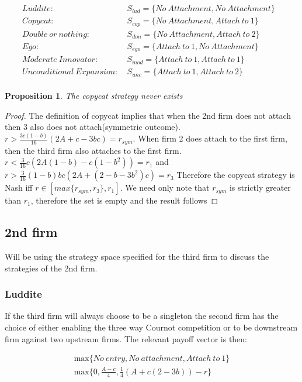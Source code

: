 \documentclass{article}
\newtheorem{proposition}{Proposition}
\begin{document}
\begin{align*}
Luddite: ~&S_{lud} =  
\{ No~ Attachment, 
No~ Attachment
\}& \\
 Copycat:~& S_{cop} =  
\{ No~ Attachment, 
Attach~to~1
\}& \\
Double~or~nothing:~ & S_{don} = 
\{ No~ Attachment, 
Attach~to~2
\}& \\ 
Ego:~& S_{ego} =  
\{ Attach~to~1, 
No~ Attachment
\}& \\
 Moderate~Innovator:~ & S_{mod} =  
\{  Attach~to~1, 
Attach~to~1
\}& \\
 Unconditional~Expansion:~ & S_{unc} = 
\{  Attach~to~1, 
Attach~to~2
\}& \\ 
\end{align*}

\begin{proposition}
The copycat strategy never exists
\end{proposition}

\begin{proof}
The definition of copycat implies that when the 2nd firm does not attach then 3 also does not attach(symmetric outcome). $r > \frac{3 c(1-b)}{16}(2A+c-3bc)=r_{sym}$. When firm 2 does attach to the first firm, then the third firm also attaches to the first firm. $r< \frac{3}{16} c \left(2 A (1-b)-c(1-b^2 ) \right)=r_{1}$ and $r > \frac{3}{16} (1 - b) b c (2 A + (2 - b - 3 b^2) c)=r_{3} $ Therefore the copycat strategy is Nash iff $r \in [max\{r_{sym}, r_{3} \}, r_{1}]$. We need only note that $r_{sym}$ is strictly greater than $r_{1}$, therefore the set is empty and the result follows
\end{proof}

\subsection{2nd firm}

Will be using the strategy space specified for the third firm to discuss the strategies of the 2nd firm. 

\subsubsection{Luddite}

If the third firm will always choose to be a singleton the second firm has the choice of either enabling the three way Cournot competition or to be downstream firm against two upstream firms. The relevant payoff vector is then:

\begin{align*}
&\text{max} \{No~entry, No~attachment, Attach~to~1 \} &\\
&\text{max} \{ 
0, \frac{A-c}{4}, \frac{1}{4}(A+c(2-3b))-r
\}&
\end{align*}
\end{document}
